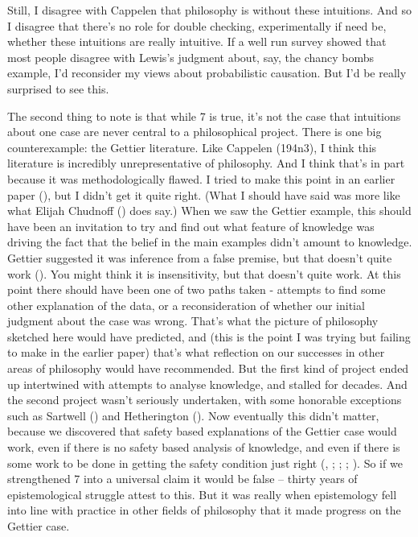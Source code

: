 \documentclass[
  10pt,
  letterpaper,
  DIV=11,
  numbers=noendperiod,
  twoside]{scrartcl}
\begin{document}
Still, I disagree with Cappelen that philosophy is without these
intuitions. And so I disagree that there's no role for double checking,
experimentally if need be, whether these intuitions are really
intuitive. If a well run survey showed that most people disagree with
Lewis's judgment about, say, the chancy bombs example, I'd reconsider my
views about probabilistic causation. But I'd be really surprised to see
this.

The second thing to note is that while 7 is true, it's not the case that
intuitions about one case are never central to a philosophical project.
There is one big counterexample: the Gettier literature. Like Cappelen
(194n3), I think this literature is incredibly unrepresentative of
philosophy. And I think that's in part because it was methodologically
flawed. I tried to make this point in an earlier paper
(), but I didn't
get it quite right. (What I should have said was more like what Elijah
Chudnoff () does say.) When we saw the
Gettier example, this should have been an invitation to try and find out
what feature of knowledge was driving the fact that the belief in the
main examples didn't amount to knowledge. Gettier suggested it was
inference from a false premise, but that doesn't quite work
(). You might think it is
insensitivity, but that doesn't quite work. At this point there should
have been one of two paths taken - attempts to find some other
explanation of the data, or a reconsideration of whether our initial
judgment about the case was wrong. That's what the picture of philosophy
sketched here would have predicted, and (this is the point I was trying
but failing to make in the earlier paper) that's what reflection on our
successes in other areas of philosophy would have recommended. But the
first kind of project ended up intertwined with attempts to analyse
knowledge, and stalled for decades. And the second project wasn't
seriously undertaken, with some honorable exceptions such as Sartwell
() and Hetherington
(). Now eventually this didn't
matter, because we discovered that safety based explanations of the
Gettier case would work, even if there is no safety based analysis of
knowledge, and even if there is some work to be done in getting the
safety condition just right
(,
;
;
;
). So if we
strengthened 7 into a universal claim it would be false -- thirty years
of epistemological struggle attest to this. But it was really when
epistemology fell into line with practice in other fields of philosophy
that it made progress on the Gettier case.
\end{document}
